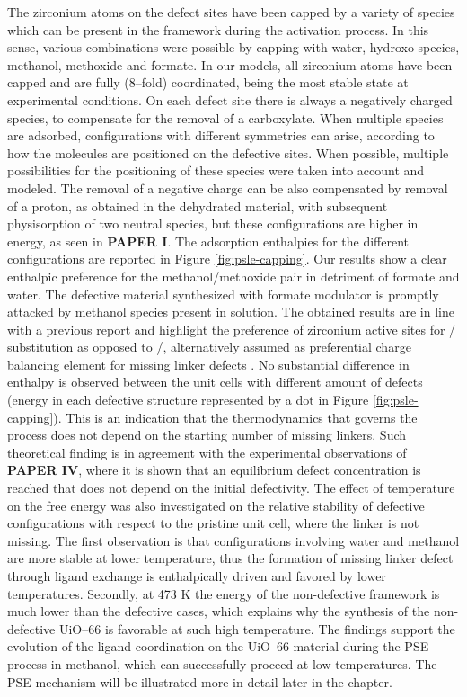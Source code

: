 The zirconium atoms on the defect sites have been capped by a variety of species which can be present in the framework during the activation process. In this sense, various combinations were possible by capping with water, hydroxo species, methanol, methoxide and formate. In our models, all zirconium atoms have been capped and are fully (8--fold) coordinated, being the most stable state at experimental conditions. On each defect site there is always a negatively charged species, to compensate for the removal of a carboxylate. When multiple species are adsorbed, configurations with different symmetries can arise, according to how the molecules are positioned on the defective sites. When possible, multiple possibilities for the positioning of these species were taken into account and modeled. The removal of a negative charge can be also compensated by removal of a proton, as obtained in the dehydrated material, with subsequent physisorption of two neutral species, but these configurations are higher in energy, as seen in \textbf{PAPER I}. The adsorption enthalpies for the different configurations are reported in Figure \ref{fig:psle-capping}. Our results show a clear enthalpic preference for the methanol/methoxide pair in detriment of formate and water. The defective material synthesized with formate modulator is promptly attacked by methanol species present in solution. The obtained results are in line with a previous report \cite{yang2016tuning} and highlight the preference of zirconium active sites for / substitution as opposed to /, alternatively assumed as preferential charge balancing element for missing linker defects \cite{trickett2015definitive, ling2016dynamic}. No substantial difference in enthalpy is observed between the unit cells with different amount of defects (energy in each defective structure represented by a dot in Figure \ref{fig:psle-capping}). This is an indication that the thermodynamics that governs the process does not depend on the starting number of missing linkers. Such theoretical finding is in agreement with the experimental observations of \textbf{PAPER IV}, where it is shown that an equilibrium defect concentration is reached that does not depend on the initial defectivity.
\npar
The effect of temperature on the free energy was also investigated on the relative stability of defective configurations with respect to the pristine unit cell, where the linker is not missing. The first observation is that configurations involving water and methanol are more stable at lower temperature, thus the formation of missing linker defect through ligand exchange is enthalpically driven and favored by lower temperatures. Secondly, at 473 K the energy of the non-defective framework is much lower than the defective cases, which explains why the synthesis of the non-defective UiO--66 is favorable at such high temperature\cite{shearer2014tuned}. 
\npar
The findings support the evolution of the ligand coordination on the UiO--66 material during the PSE process in methanol, which can successfully proceed at low temperatures. The PSE mechanism will be illustrated more in detail later in the chapter.

